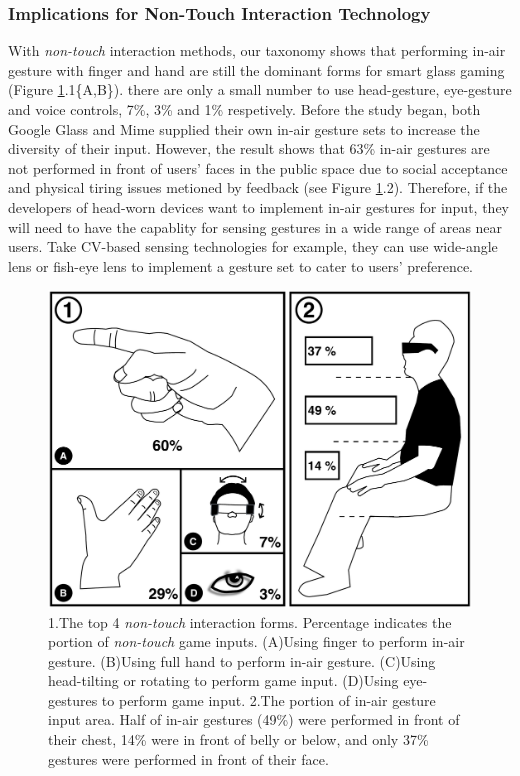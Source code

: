 \documentclass{sigchi}
\begin{document}
    \subsubsection{Implications for Non-Touch Interaction Technology}
    With \emph{non-touch} interaction methods, our taxonomy shows that performing in-air gesture with finger and hand are still the dominant forms for smart glass gaming (Figure \ref{fig:figureInAirPorpotion}.1\{A,B\}). there are only a small number to use head-gesture, eye-gesture and voice controls, 7\%, 3\% and 1\% respetively.
    Before the study began, both Google Glass and Mime\cite{GoogleGlass, Colaco:2013:MCL:2501988.2502042} supplied their own in-air gesture sets to increase the diversity of their input. However, the result shows that 63\% in-air gestures are not performed in front of users' faces in the public space due to social acceptance and physical tiring issues metioned by feedback (see Figure \ref{fig:figureInAirPorpotion}.2). Therefore, if the developers of head-worn devices want to implement in-air gestures for input, they will need to have the capablity for sensing gestures in a wide range of areas near users. Take CV-based sensing technologies for example, they can use wide-angle lens or fish-eye lens to implement a gesture set to cater to users' preference.   
  \begin{figure}[!h]
  \centering
  \includegraphics[width=1\columnwidth]{InAirControlArea.pdf}
  \caption{1.The top 4 \emph{non-touch} interaction forms. Percentage indicates the portion of \emph{non-touch} game inputs. (A)Using finger to perform in-air gesture. (B)Using full hand to perform in-air gesture. (C)Using head-tilting or rotating to perform game input. (D)Using eye-gestures to perform game input. 2.The portion of in-air gesture input area. Half of in-air gestures (49\%) were performed in front of their chest, 14\% were in front of belly or below, and only 37\% gestures were performed in front of their face.}
  \label{fig:figureInAirPorpotion}
  \end{figure}
\end{document}
